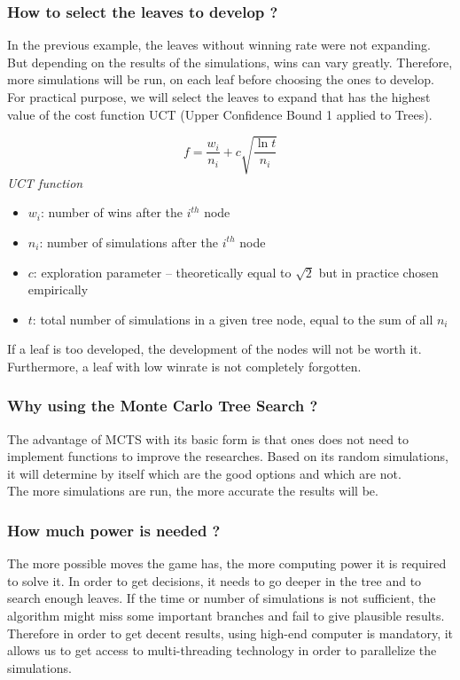 \subsubsection{How to select the leaves to develop ?}
In the previous example, the leaves without winning rate were not expanding. But depending on the results of the simulations, wins can vary greatly. Therefore, more simulations will be run, on each leaf before choosing the ones to develop. For practical purpose, we will select the leaves to expand that has the highest value of the cost function UCT (Upper Confidence Bound 1 applied to Trees).\\
\bigskip
\begin{minipage}[b]{1\linewidth}
\centering
\begin{equation*}
f = \frac{w_i}{n_i} + c\sqrt{\frac{\ln t}{n_i}}
\end{equation*}
\medskip
\textit{UCT function}\cite{formula_UCT}

\end{minipage}%
\bigskip
\begin{itemize}
  \item \ensuremath{w_i}: number of wins after the \ensuremath{ i^{th}} node
  \item \ensuremath{n_i}: number of simulations after the \ensuremath{ i^{th}} node
  \item \ensuremath{c}: exploration parameter – theoretically equal to \ensuremath{\sqrt{2}} but in practice chosen empirically
  \item \ensuremath{t}: total number of simulations in a given tree node, equal to the sum of all \ensuremath{n_i}
\end{itemize}

If a leaf is too developed, the development of the nodes will not be worth it. Furthermore, a leaf with low winrate is not completely forgotten.\\

\subsubsection{Why using the Monte Carlo Tree Search ?}
 The advantage of MCTS with its basic form is that ones does not need to implement functions to improve the researches. Based on its random simulations, it will determine by itself which are the good options and which are not.\\ The more simulations are run, the more accurate the results will be.

\subsubsection{How much power is needed ?}
The more possible moves the game has, the more computing power it is required to solve it. In order to get decisions, it needs to go deeper in the tree and to search enough leaves. If the time or number of simulations is not sufficient, the algorithm might miss some important branches and fail to give plausible results. Therefore in order to get decent results, using high-end computer is mandatory, it allows us to get access to multi-threading technology in order to parallelize the simulations.